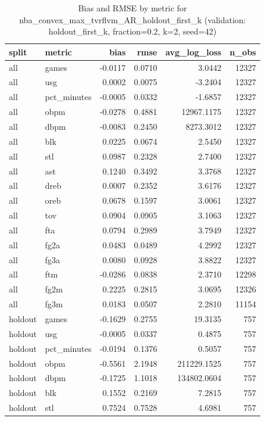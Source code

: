 \begin{table}
\caption{Bias and RMSE by metric for nba_convex_max_tvrflvm_AR_holdout_first_k (validation: holdout_first_k, fraction=0.2, k=2, seed=42)}
\label{tab:nba_convex_max_tvrflvm_AR_holdout_first_k_vs_holdout_first_k_f20_k2_s42_bias_rmse}
\begin{tabular}{llrrrr}
\toprule
split & metric & bias & rmse & avg\_log\_loss & n\_obs \\
\midrule
all & games & -0.0117 & 0.0710 & 3.0442 & 12327 \\
all & usg & 0.0002 & 0.0075 & -3.2404 & 12327 \\
all & pct\_minutes & -0.0005 & 0.0332 & -1.6857 & 12327 \\
all & obpm & -0.0278 & 0.4881 & 12967.1175 & 12327 \\
all & dbpm & -0.0083 & 0.2450 & 8273.3012 & 12327 \\
all & blk & 0.0225 & 0.0674 & 2.5450 & 12327 \\
all & stl & 0.0987 & 0.2328 & 2.7400 & 12327 \\
all & ast & 0.1240 & 0.3492 & 3.3768 & 12327 \\
all & dreb & 0.0007 & 0.2352 & 3.6176 & 12327 \\
all & oreb & 0.0678 & 0.1597 & 3.0061 & 12327 \\
all & tov & 0.0904 & 0.0905 & 3.1063 & 12327 \\
all & fta & 0.0794 & 0.2989 & 3.7949 & 12327 \\
all & fg2a & 0.0483 & 0.0489 & 4.2992 & 12327 \\
all & fg3a & 0.0080 & 0.0928 & 3.8822 & 12327 \\
all & ftm & -0.0286 & 0.0838 & 2.3710 & 12298 \\
all & fg2m & 0.2225 & 0.2815 & 3.0695 & 12326 \\
all & fg3m & 0.0183 & 0.0507 & 2.2810 & 11154 \\
holdout & games & -0.1629 & 0.2755 & 19.3135 & 757 \\
holdout & usg & -0.0005 & 0.0337 & 0.4875 & 757 \\
holdout & pct\_minutes & -0.0194 & 0.1376 & 0.5057 & 757 \\
holdout & obpm & -0.5561 & 2.1948 & 211229.1525 & 757 \\
holdout & dbpm & -0.1725 & 1.1018 & 134802.0604 & 757 \\
holdout & blk & 0.1552 & 0.2169 & 7.2815 & 757 \\
holdout & stl & 0.7524 & 0.7528 & 4.6981 & 757 \\

\end{tabular}
\end{table}
